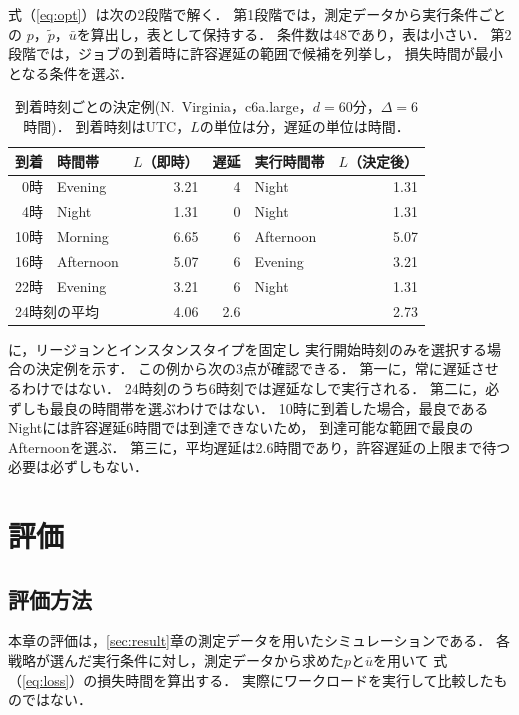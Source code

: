 \documentclass[submit,techrep,noauthor]{ipsj}
\begin{document}
式（\ref{eq:opt}）は次の2段階で解く．
第1段階では，測定データから実行条件ごとの
$p$，$\tilde{p}$，$\bar{u}$を算出し，表として保持する．
条件数は48であり，表は小さい．
第2段階では，ジョブの到着時に許容遅延の範囲で候補を列挙し，
損失時間が最小となる条件を選ぶ．

\begin{table}[tb]
\caption{到着時刻ごとの決定例(N.~Virginia，c6a.large，$d=60$分，$\Delta=6$時間)．
到着時刻はUTC，$L$の単位は分，遅延の単位は時間．}
\label{tab:decision}
\centering
\setlength{\tabcolsep}{4pt}
\begin{tabular}{rlrrlr}\hline\hline
到着 & 時間帯 & $L$（即時） & 遅延 & 実行時間帯 & $L$（決定後）\\\hline
0時  & Evening   & 3.21 & 4 & Night     & 1.31\\
4時  & Night     & 1.31 & 0 & Night     & 1.31\\
10時 & Morning   & 6.65 & 6 & Afternoon & 5.07\\
16時 & Afternoon & 5.07 & 6 & Evening   & 3.21\\
22時 & Evening   & 3.21 & 6 & Night     & 1.31\\\hline
\multicolumn{2}{l}{24時刻の平均} & 4.06 & 2.6 & & 2.73\\\hline
\end{tabular}
\end{table}

に，リージョンとインスタンスタイプを固定し
実行開始時刻のみを選択する場合の決定例を示す．
この例から次の3点が確認できる．
第一に，常に遅延させるわけではない．
24時刻のうち6時刻では遅延なしで実行される．
第二に，必ずしも最良の時間帯を選ぶわけではない．
10時に到着した場合，最良であるNightには許容遅延6時間では到達できないため，
到達可能な範囲で最良のAfternoonを選ぶ．
第三に，平均遅延は2.6時間であり，許容遅延の上限まで待つ必要は必ずしもない．


\section{評価}
\label{sec:eval}

\subsection{評価方法}

本章の評価は，\ref{sec:result}章の測定データを用いたシミュレーションである．
各戦略が選んだ実行条件に対し，測定データから求めた$p$と$\bar{u}$を用いて
式（\ref{eq:loss}）の損失時間を算出する．
実際にワークロードを実行して比較したものではない．
\end{document}
